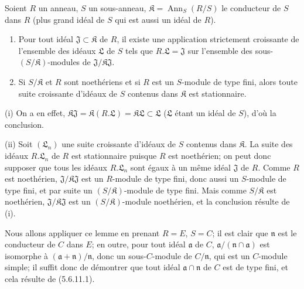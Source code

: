 \begin{example}[5.6.11]
\begin{lemma}[5.6.11.1]
Soient $R$ un anneau, $S$ un sous-anneau,
$\mathfrak K=\operatorname{Ann}_S(R/S)$ le conducteur de $S$ dans $R$
(plus grand idéal de $S$ qui est aussi un idéal de $R$).
\begin{enumerate}
\item[\textup{(i)}] Pour tout idéal $\mathfrak J\subset\mathfrak K$ de $R$, il existe
une application strictement croissante de l'ensemble des idéaux
$\mathfrak L$ de $S$ tels que $R.\mathfrak L=\mathfrak J$ sur l'ensemble des
sous-$(S/\mathfrak K)$-modules de
$\mathfrak J/\mathfrak K\mathfrak J$.
\item[\textup{(ii)}] Si $S/\mathfrak K$ et $R$ sont noethériens et si $R$ est un
$S$-module de type fini, alors toute suite croissante d'idéaux de $S$
contenus dans $\mathfrak K$ est stationnaire.
\end{enumerate}
\end{lemma}

(i) On a en effet,
$\mathfrak K\mathfrak J=\mathfrak K(R.\mathfrak L)
=\mathfrak K\mathfrak L\subset\mathfrak L$
($\mathfrak L$ étant un idéal de $S$), d'où la conclusion.

(ii) Soit $(\mathfrak L_n)$ une suite croissante d'idéaux de $S$ contenus
dans $\mathfrak K$. La suite des idéaux $R.\mathfrak L_n$ de $R$ est
stationnaire puisque $R$ est noethérien; on peut donc supposer que tous les
idéaux $R.\mathfrak L_n$ sont égaux à un même idéal $\mathfrak J$ de $R$.
Comme $R$ est noethérien, $\mathfrak J/\mathfrak K\mathfrak J$ est un
$R$-module de type fini, donc aussi un $S$-module de type fini, et par suite
un $(S/\mathfrak K)$-module de type fini. Mais comme $S/\mathfrak K$ est
noethérien, $\mathfrak J/\mathfrak K\mathfrak J$ est un
$(S/\mathfrak K)$-module noethérien, et la conclusion résulte de (i).

Nous allons appliquer ce lemme en prenant $R=E$, $S=C$; il est clair que
$\mathfrak n$ est le conducteur de $C$ dans $E$; en outre, pour tout idéal
$\mathfrak a$ de $C$,
$\mathfrak a/(\mathfrak n\cap\mathfrak a)$ est isomorphe à
$(\mathfrak a+\mathfrak n)/\mathfrak n$, donc un sous-$C$-module de
$C/\mathfrak n$, qui est un $C$-module simple; il suffit donc de démontrer
que tout idéal $\mathfrak a\cap\mathfrak n$ de $C$ est de type fini, et cela
résulte de (5.6.11.1).


\end{example}
